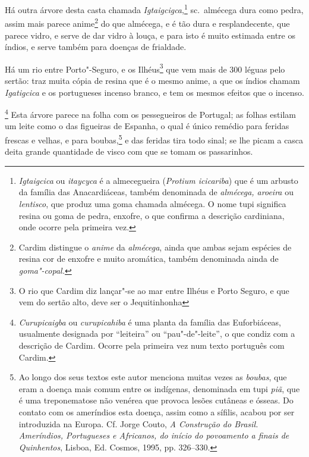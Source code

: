 Há outra árvore desta casta chamada \textit{Igtaigcigca},\footnote{ \textit{Igtaigcica} 
ou \textit{itaycyca} é a almecegueira
(\textit{Protium icicariba}) que é um arbusto da família das
Anacardiáceas, também denominada de \textit{almécega, aroeira} ou
\textit{lentisco}, que produz uma goma chamada almécega. O nome tupi
significa resina ou goma de pedra, enxofre, o que confirma a descrição
cardiniana, onde ocorre pela primeira vez.} sc.~almécega dura como
pedra, assim mais parece anime\footnote{ Cardim distingue o
\textit{anime} da \textit{almécega}, ainda que ambas sejam espécies de
resina cor de enxofre e muito aromática, também denominada ainda de
\textit{goma"-copal.} } do que almécega, e é tão dura e resplandecente,
que parece vidro, e serve de dar vidro à louça, e para isto é muito
estimada entre os índios, e serve também para doenças de frialdade.

 Há um rio entre Porto"-Seguro, e os Ilhéus\footnote{ O rio que Cardim
diz lançar"-se ao mar entre Ilhéus e Porto Seguro, e que vem do sertão
alto, deve ser o Jequitinhonha} que vem mais de 300 léguas
pelo sertão: traz muita cópia de resina que é o mesmo anime, a que os
índios chamam \textit{Igatigcica} e os portugueses incenso branco, e
tem os mesmos efeitos que o incenso.

\footnote{ \textit{Curupicaigba} ou
\textit{curupicahiba} é uma planta da família das Euforbiáceas,
usualmente designada por ``leiteira'' ou ``pau"-de"-leite'', o que condiz
com a descrição de Cardim. Ocorre pela primeira vez num texto português
com Cardim.} Esta árvore parece na folha com os pessegueiros
de Portugal; as folhas estilam um leite como o das figueiras de
Espanha, o qual é único remédio para feridas frescas e velhas, e para
boubas,\footnote{ Ao longo dos seus textos este autor menciona muitas
vezes as \textit{boubas}, que eram a doença mais comum entre os
indígenas, denominada em tupi \textit{piã}, que é uma treponematose não
venérea que provoca lesões cutâneas e ósseas. Do contato com os
ameríndios esta doença, assim como a sífilis, acabou por ser introduzida na
Europa. Cf. Jorge Couto, \textit{A Construção do Brasil. Ameríndios,
Portugueses e Africanos, do início do povoamento a finais de
Quinhentos}, Lisboa, Ed. Cosmos, 1995, pp. 326--330.} e das feridas
tira todo sinal; se lhe picam a casca deita grande quantidade de visco
com que se tomam os passarinhos.

